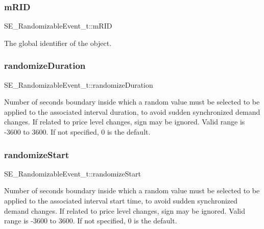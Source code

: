 \subsubsection{\texorpdfstring{m\+R\+ID}{mRID}}
{\footnotesize\ttfamily S\+E\+\_\+\+Randomizable\+Event\+\_\+t\+::m\+R\+ID}

The global identifier of the object. \mbox{\label{group__RandomizableEvent_ga6e6106d5c42ed5e0148e74fec7ff7e40}} 
\subsubsection{\texorpdfstring{randomize\+Duration}{randomizeDuration}}
{\footnotesize\ttfamily S\+E\+\_\+\+Randomizable\+Event\+\_\+t\+::randomize\+Duration}

Number of seconds boundary inside which a random value must be selected to be applied to the associated interval duration, to avoid sudden synchronized demand changes. If related to price level changes, sign may be ignored. Valid range is -\/3600 to 3600. If not specified, 0 is the default. \mbox{\label{group__RandomizableEvent_ga57f58e1327bdf7b248fd53ce7590c13d}} 
\subsubsection{\texorpdfstring{randomize\+Start}{randomizeStart}}
{\footnotesize\ttfamily S\+E\+\_\+\+Randomizable\+Event\+\_\+t\+::randomize\+Start}

Number of seconds boundary inside which a random value must be selected to be applied to the associated interval start time, to avoid sudden synchronized demand changes. If related to price level changes, sign may be ignored. Valid range is -\/3600 to 3600. If not specified, 0 is the default. \mbox{\label{group__RandomizableEvent_ga19e78ab6dd368078b3d4bb1702682e2b}} 
